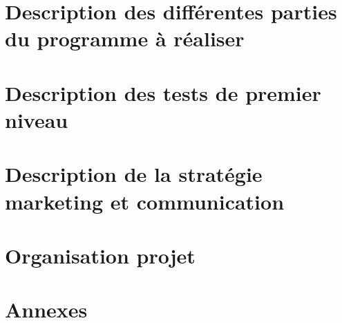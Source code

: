 \documentclass[11pt]{report}
\begin{document}
\chapter{Description des différentes parties du programme à réaliser}
\thispagestyle{EIP} %


\chapter{Description des tests de premier niveau}
\thispagestyle{EIP} %


\chapter{Description de la stratégie marketing et communication}
\thispagestyle{EIP} %


\chapter{Organisation projet}
\thispagestyle{EIP} %


\chapter{Annexes}
\thispagestyle{EIP} %

\end{document}
